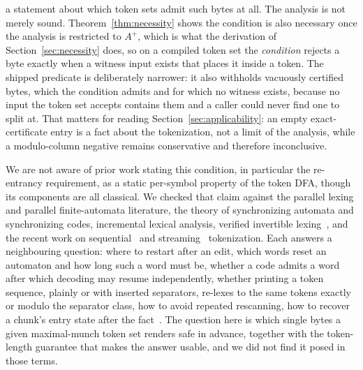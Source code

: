 \documentclass[11pt,a4paper]{article}
\theoremstyle{definition}
\theoremstyle{plain}
\begin{document}
a statement about which token sets admit such bytes at all. The analysis is not merely sound.
Theorem~\ref{thm:necessity} shows the condition is also necessary once the analysis is restricted to $A^+$, which is
what the derivation of Section~\ref{sec:necessity} does, so on a compiled token set the \emph{condition} rejects a
byte exactly when a witness input exists that places it inside a token. The shipped predicate is deliberately
narrower: it also withholds vacuously certified bytes, which the condition admits and for which no witness exists,
because no input the token set accepts contains them and a caller could never find one to split at. That matters for
reading Section~\ref{sec:applicability}: an empty exact-certificate entry is a fact about the tokenization, not a
limit of the analysis, while a modulo-column negative remains conservative and therefore inconclusive.

We are not aware of prior work stating this condition, in particular the re-entrancy requirement, as a static per-symbol
property of the token DFA, though its components are all classical. We checked that claim against the parallel lexing
and parallel finite-automata literature, the theory of synchronizing automata and synchronizing codes, incremental
lexical analysis, verified invertible lexing~\cite{chassot2026ziplex}, and the recent work on
sequential~\cite{reps1998maximal,li2025uniform} and streaming~\cite{li2026streaming} tokenization. Each answers a
neighbouring question: where to restart after an edit, which words reset an automaton and how long such a word must be,
whether a code admits a word after which decoding may resume independently, whether printing a token sequence, plainly
or with inserted separators, re-lexes to the same tokens exactly or modulo the separator class, how to avoid repeated
rescanning, how to recover a chunk's entry state after the fact~\cite{voetter2021gpu}. The question here is which single
bytes a given maximal-munch token set renders safe in advance, together with the token-length guarantee that makes the
answer usable, and we did not find it posed in those terms.
\end{document}
